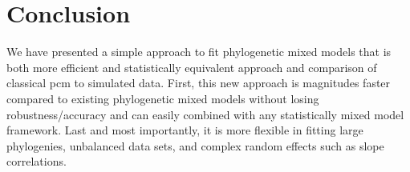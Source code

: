 % 
% 
% 
% 
% 
% 

\section{Conclusion}

We have presented a simple approach to fit phylogenetic mixed models that is both more efficient and statistically equivalent approach and comparison of classical pcm to simulated data. 
First, this new approach is magnitudes faster compared to existing phylogenetic mixed models without losing robustness/accuracy and can easily combined with any statistically mixed model framework. 
Last and most importantly, it is more flexible in fitting large phylogenies, unbalanced data sets, and complex random effects such as slope correlations.



